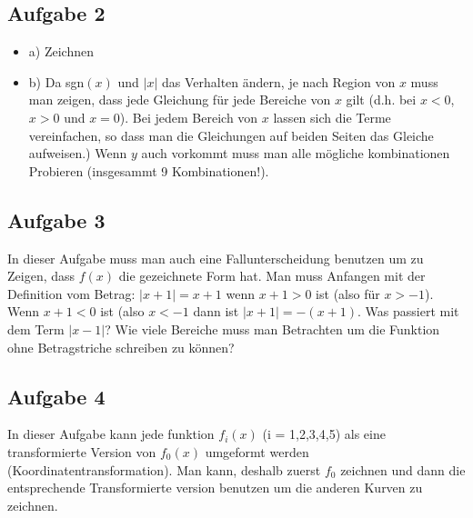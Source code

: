 \documentclass[11pt]{article} %
\begin{document}
\subsection{Aufgabe 2}
\begin{itemize}
\item a) Zeichnen
\item b) Da sgn$(x)$ und $|x|$ das Verhalten ändern, je nach Region von $x$ muss man zeigen, dass jede Gleichung für jede Bereiche von $x$ gilt (d.h. bei $x<0$, $x> 0$ und $x=0$). Bei jedem Bereich von $x$ lassen sich die Terme vereinfachen, so dass man die Gleichungen auf beiden Seiten das Gleiche aufweisen.) Wenn $y$ auch vorkommt muss man alle mögliche kombinationen Probieren (insgesammt 9 Kombinationen!).
\end{itemize}

\subsection{Aufgabe 3}
In dieser Aufgabe muss man auch eine Fallunterscheidung benutzen um zu Zeigen, dass $f(x)$ die gezeichnete Form hat. Man muss Anfangen mit der Definition vom Betrag: $|x+1| = x + 1$ wenn $x+1 >0$ ist (also für $x>-1$). Wenn $x+1 <0$ ist (also $x<-1$ dann ist $|x+1| = -(x+1)$. Was passiert mit dem Term $|x-1|$? Wie viele Bereiche muss man Betrachten um die Funktion ohne Betragstriche schreiben zu können?

\subsection{Aufgabe 4}
In dieser Aufgabe kann jede funktion $f_i(x)$ (i = 1,2,3,4,5) als eine transformierte Version von $f_0(x)$ umgeformt werden (Koordinatentransformation). Man kann, deshalb zuerst $f_0$ zeichnen und dann die entsprechende Transformierte version benutzen um die anderen Kurven zu zeichnen.
\end{document}
